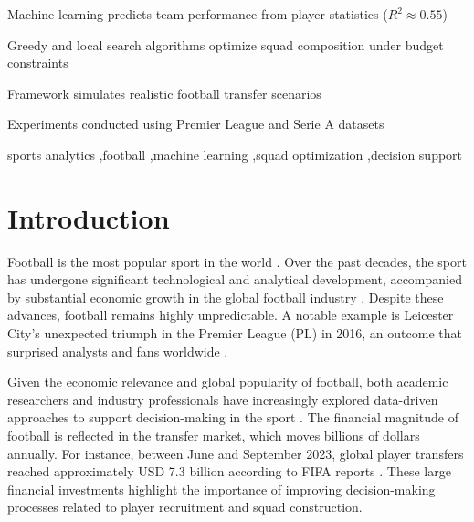 \documentclass[a4paper,fleqn]{cas-sc}
\begin{document}

\begin{highlights}
\item Machine learning predicts team performance from player statistics ($R^2 \approx 0.55$)
\item Greedy and local search algorithms optimize squad composition under budget constraints
\item Framework simulates realistic football transfer scenarios
\item Experiments conducted using Premier League and Serie A datasets
\end{highlights}

\begin{keywords}
sports analytics \sep football \sep machine learning \sep squad optimization \sep decision support
\end{keywords}

\maketitle

\section{Introduction}

Football is the most popular sport in the world \cite{Almulla2023}. Over the past decades, the sport has undergone significant technological and analytical 
development, accompanied by substantial economic growth in the global football industry \cite{Rodrigues2022}. Despite these advances, football remains highly 
unpredictable. A notable example is Leicester City's unexpected triumph in the Premier League (PL) in 2016, an outcome that surprised analysts 
and fans worldwide \cite{Baboota2019}.

Given the economic relevance and global popularity of football, both academic researchers and industry professionals have increasingly explored 
data-driven approaches to support decision-making in the sport \cite{Baboota2019}. The financial magnitude of football is reflected in the transfer market, 
which moves billions of dollars annually. For instance, between June and September 2023, global player transfers reached approximately USD 7.3 billion according 
to FIFA reports \cite{Globo2023}. These large financial investments highlight the importance of improving decision-making processes related to player recruitment 
and squad construction.
\end{document}
